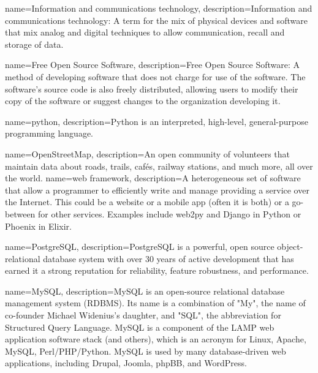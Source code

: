 

{
    name=Information and communications technology,
    description={Information and communications technology: A term for the mix of physical devices and software that mix analog and digital techniques to allow communication, recall and storage of data.}
}
 
{
    name=Free Open Source Software,
    description={Free Open Source Software: A method of developing software that does not charge for use of the software. The software's source code is also freely distributed, allowing users to modify their copy of the software or suggest changes to the organization developing it.}
}

{
    name=python,
    description={Python is an interpreted, high-level, general-purpose programming language.}
}

{
    name=OpenStreetMap,
    description={An open community of volunteers that maintain data about roads, trails, cafés, railway stations, and much more, all over the world.}
}
{
    name=web framework,
    description={A heterogeneous set of software that allow a programmer to efficiently write and manage providing a service over the Internet. This could be a website or a mobile app (often it is both) or a go-between for other services. Examples include web2py and Django in Python or Phoenix in Elixir.}
}

{
   name=PostgreSQL,
   description={PostgreSQL is a powerful, open source object-relational database system with over 30 years of active development that has earned it a strong reputation for reliability, feature robustness, and performance.}
}

{
   name=MySQL,
   description={MySQL is an open-source relational database management system (RDBMS). Its name is a combination of "My", the name of co-founder Michael Widenius's daughter, and "SQL", the abbreviation for Structured Query Language. MySQL is a component of the LAMP web application software stack (and others), which is an acronym for Linux, Apache, MySQL, Perl/PHP/Python. MySQL is used by many database-driven web applications, including Drupal, Joomla, phpBB, and WordPress.}
}

